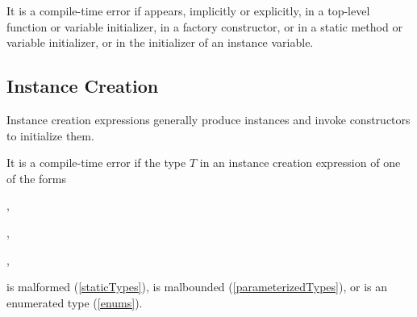 \documentclass[makeidx]{article}
\begin{document}
\LMHash{}%
It is a compile-time error if \THIS{} appears, implicitly or explicitly, in a top-level function or variable initializer, in a factory constructor, or in a static method or variable initializer, or in the initializer of an instance variable.


\subsection{Instance Creation}

\LMHash{}%
Instance creation expressions generally produce instances
and invoke constructors to initialize them.




\LMHash{}%
It is a compile-time error if
the type $T$ in an instance creation expression of one of the forms

,

,

,


\noindent
is malformed (\ref{staticTypes}),
is malbounded (\ref{parameterizedTypes}),
or is an enumerated type (\ref{enums}).
\end{document}
